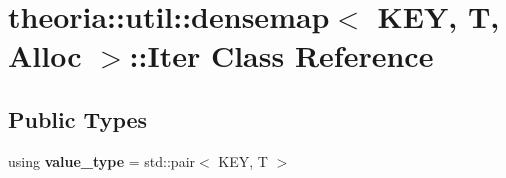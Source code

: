 \hypertarget{classtheoria_1_1util_1_1densemap_1_1Iter}{\section{theoria\+:\+:util\+:\+:densemap$<$ K\+E\+Y, T, Alloc $>$\+:\+:Iter Class Reference}
\label{classtheoria_1_1util_1_1densemap_1_1Iter}
}
\subsection*{Public Types}
\begin{DoxyCompactItemize}
\item 
\hypertarget{classtheoria_1_1util_1_1densemap_1_1Iter_a8a1cedbd37c4faee8284d6f1debd49f2}{using {\bfseries value\+\_\+type} = std\+::pair$<$ K\+E\+Y, T $>$}\label{classtheoria_1_1util_1_1densemap_1_1Iter_a8a1cedbd37c4faee8284d6f1debd49f2}

\end{DoxyCompactItemize}
